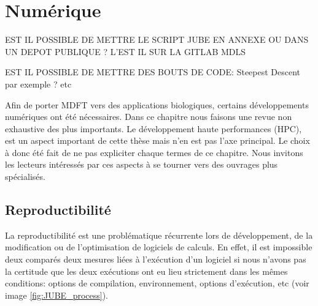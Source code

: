 \chapter{Numérique}




EST IL POSSIBLE DE METTRE LE SCRIPT JUBE EN ANNEXE OU DANS UN DEPOT PUBLIQUE ? L'EST IL SUR LA GITLAB MDLS

EST IL POSSIBLE DE METTRE DES BOUTS DE CODE: Steepest Descent par exemple ? etc


Afin de porter MDFT vers des applications biologiques, certains développements numériques ont été nécessaires. Dans ce chapitre nous faisons une revue non exhaustive des plus importants. Le développement haute performances (HPC), est un aspect important de cette thèse mais n'en est pas l'axe principal. Le choix à donc été fait de ne pas expliciter chaque termes de ce chapitre. Nous invitons les lecteurs intéressés par ces aspects à se tourner vers des ouvrages plus spécialisés.


\section{Reproductibilité}
La reproductibilité est une problématique récurrente lors de développement, de la modification ou de l'optimisation de logiciels de calculs. En effet, il est impossible deux comparés deux mesures liées à l’exécution d'un logiciel si nous n'avons pas la certitude que les deux exécutions ont eu lieu strictement dans les mêmes conditions: options de compilation, environnement, options d’exécution, etc (voir image \ref{fig:JUBE_process}).

